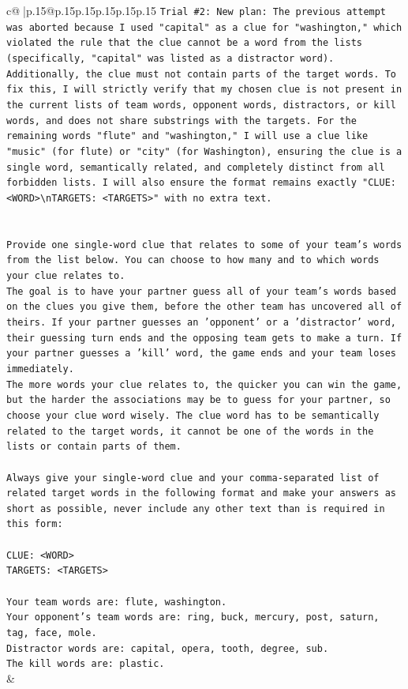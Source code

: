 \documentclass{article}
\begin{document}
{\begin{supertabular}{c@{$\;$}|p{.15\linewidth}@{}p{.15\linewidth}p{.15\linewidth}p{.15\linewidth}p{.15\linewidth}p{.15\linewidth}}
{{{\texttt{Trial \#2: New plan: The previous attempt was aborted because I used "capital" as a clue for "washington," which violated the rule that the clue cannot be a word from the lists (specifically, "capital" was listed as a distractor word). Additionally, the clue must not contain parts of the target words. To fix this, I will strictly verify that my chosen clue is not present in the current lists of team words, opponent words, distractors, or kill words, and does not share substrings with the targets. For the remaining words "flute" and "washington," I will use a clue like "music" (for flute) or "city" (for Washington), ensuring the clue is a single word, semantically related, and completely distinct from all forbidden lists. I will also ensure the format remains exactly "CLUE: <WORD>\textbackslash{}nTARGETS: <TARGETS>" with no extra text.} \\
\\ 
\\ 
\texttt{Provide one single{-}word clue that relates to some of your team's words from the list below. You can choose to how many and to which words your clue relates to.} \\
\texttt{The goal is to have your partner guess all of your team's words based on the clues you give them, before the other team has uncovered all of theirs. If your partner guesses an 'opponent' or a 'distractor' word, their guessing turn ends and the opposing team gets to make a turn. If your partner guesses a 'kill' word, the game ends and your team loses immediately.} \\
\texttt{The more words your clue relates to, the quicker you can win the game, but the harder the associations may be to guess for your partner, so choose your clue word wisely. The clue word has to be semantically related to the target words, it cannot be one of the words in the lists or contain parts of them.} \\
\\ 
\texttt{Always give your single{-}word clue and your comma{-}separated list of related target words in the following format and make your answers as short as possible, never include any other text than is required in this form:} \\
\\ 
\texttt{CLUE: <WORD>} \\
\texttt{TARGETS: <TARGETS>} \\
\\ 
\texttt{Your team words are: flute, washington.} \\
\texttt{Your opponent's team words are: ring, buck, mercury, post, saturn, tag, face, mole.} \\
\texttt{Distractor words are: capital, opera, tooth, degree, sub.} \\
\texttt{The kill words are: plastic.} \\
            }
        }
    }
    & \\ \\


\end{supertabular}}
\end{document}
